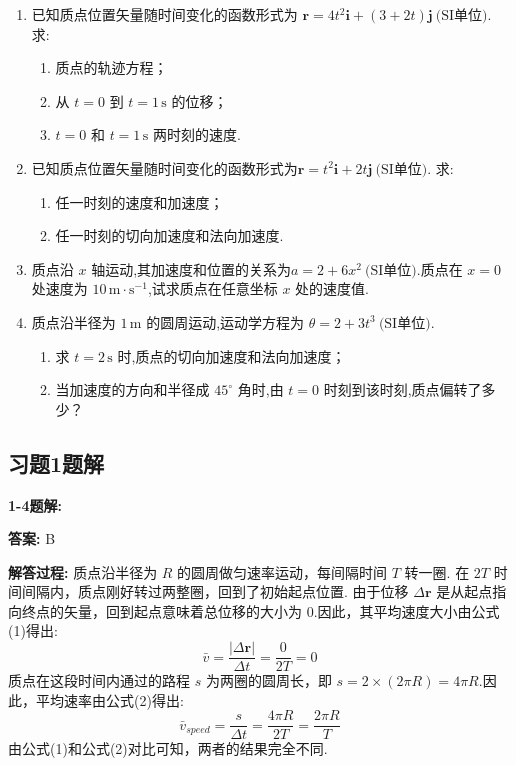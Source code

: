 \begin{enumerate}
\item[\textbf{1-18}] 已知质点位置矢量随时间变化的函数形式为
$\mathbf{r}=4t^2\mathbf{i}+(3+2t)\mathbf{j}\ \text{(SI单位)}.$
求:
\begin{enumerate}
	\item 质点的轨迹方程；
	\item 从 \(t=0\) 到 \(t=1\,\text{s}\) 的位移；
	\item \(t=0\) 和 \(t=1\,\text{s}\) 两时刻的速度.
\end{enumerate}


\item[\textbf{1-20}] 已知质点位置矢量随时间变化的函数形式为$\mathbf{r}=t^2\mathbf{i}+2t\mathbf{j}\ \text{(SI单位)}.$
求:
\begin{enumerate}
	\item 任一时刻的速度和加速度；
	\item 任一时刻的切向加速度和法向加速度.
\end{enumerate}

\item[\textbf{1-25}] 质点沿 \(x\) 轴运动,其加速度和位置的关系为$a=2+6x^2\ \text{(SI单位)}.$质点在 \(x=0\) 处速度为 \(10\,\text{m}\cdot\text{s}^{-1}\),试求质点在任意坐标 \(x\) 处的速度值.

\item[\textbf{1-26}] 质点沿半径为 \(1\,\text{m}\) 的圆周运动,运动学方程为
$\theta=2+3t^3\ \text{(SI单位)}.$

\begin{enumerate}
	\item 求 \(t=2\,\text{s}\) 时,质点的切向加速度和法向加速度；
	\item 当加速度的方向和半径成 \(45^\circ\) 角时,由 \(t=0\) 时刻到该时刻,质点偏转了多少？
\end{enumerate}

\end{enumerate}

\subsection{习题1题解}

\textbf{1-4题解:}


\textbf{答案:} B

\textbf{解答过程:}
质点沿半径为 $R$ 的圆周做匀速率运动，每间隔时间 $T$ 转一圈.
在 $2T$ 时间间隔内，质点刚好转过两整圈，回到了初始起点位置.
由于位移 $\Delta \mathbf{r}$ 是从起点指向终点的矢量，回到起点意味着总位移的大小为 $0$.因此，其平均速度大小由公式(1)得出:
\begin{equation}
	\bar{v} = \frac{|\Delta \mathbf{r}|}{\Delta t} = \frac{0}{2T} = 0
\end{equation}
质点在这段时间内通过的路程 $s$ 为两圈的圆周长，即 $s = 2 \times (2\pi R) = 4\pi R$.因此，平均速率由公式(2)得出:
\begin{equation}
	\bar{v}_{speed} = \frac{s}{\Delta t} = \frac{4\pi R}{2T} = \frac{2\pi R}{T}
\end{equation}
由公式(1)和公式(2)对比可知，两者的结果完全不同.

